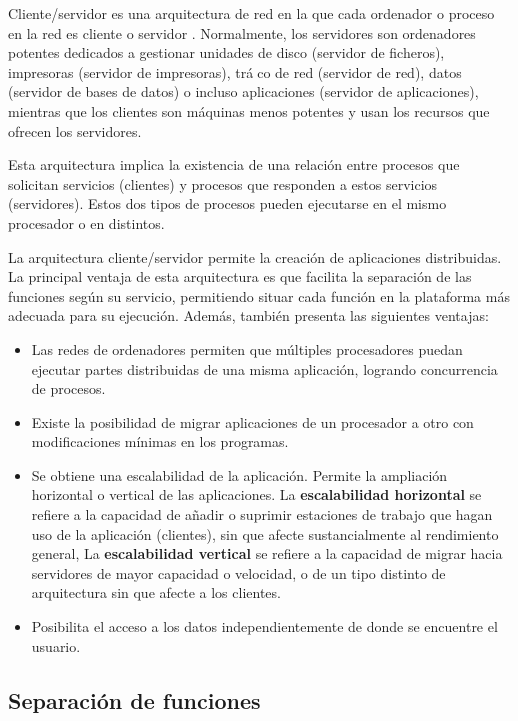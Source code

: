 Cliente/servidor es una arquitectura de red
en la que cada ordenador o proceso en
la red es cliente o servidor
. Normalmente, los servidores son ordenadores potentes
dedicados a gestionar unidades de disco (servidor de ficheros), impresoras (servidor de impresoras), tráco de red (servidor de red), datos (servidor de bases de datos) o
incluso aplicaciones (servidor de aplicaciones), mientras que los clientes son máquinas
menos potentes y usan los recursos que ofrecen los servidores.

Esta arquitectura implica la existencia de una relación entre procesos que solicitan
servicios (clientes) y procesos que responden a estos servicios (servidores). Estos
dos tipos de procesos pueden ejecutarse en el mismo procesador o en distintos.

La arquitectura cliente/servidor permite la creación de aplicaciones distribuidas.
La principal ventaja de esta arquitectura es que facilita la separación de las funciones
según su servicio, permitiendo situar cada función en la plataforma más adecuada
para su ejecución. Además, también presenta las siguientes ventajas:
\begin{itemize}
	\item Las redes de ordenadores permiten que múltiples procesadores puedan ejecutar
	partes distribuidas de una misma aplicación, logrando concurrencia de procesos.
	\item Existe la posibilidad de migrar aplicaciones de un procesador a otro con modificaciones mínimas en los programas.
	\item Se obtiene una escalabilidad de la aplicación. Permite la ampliación horizontal
	o vertical de las aplicaciones. La \textbf{escalabilidad horizontal} se refiere a la capacidad de añadir o suprimir estaciones de trabajo que hagan uso de la aplicación
	(clientes), sin que afecte sustancialmente al rendimiento general, La \textbf{escalabilidad vertical} se refiere a la capacidad de migrar hacia servidores
	de mayor capacidad o velocidad, o de un tipo distinto de arquitectura sin que
	afecte a los clientes.
	\item Posibilita el acceso a los datos independientemente de donde se encuentre el
usuario.
\end{itemize}	

\subsection{Separación de funciones}

